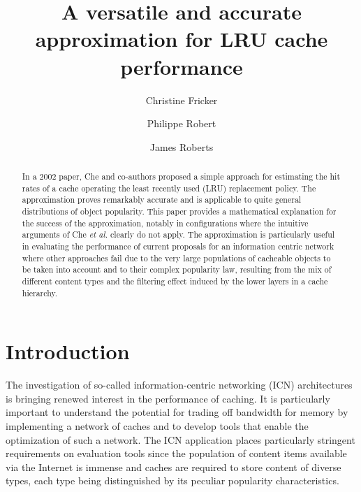 \documentclass{amsart}
\author[C. Fricker]{Christine Fricker}
\author[Ph. Robert]{Philippe Robert}
\author[J. Roberts]{James Roberts}
\def\etal{{\em et al. }}
\begin{document}
\title{A versatile and accurate approximation for LRU cache performance }











\begin{abstract}
In a 2002 paper, Che and co-authors proposed a simple approach for estimating the hit rates of a cache operating the least recently used (LRU) replacement policy. The approximation proves remarkably accurate and is applicable to quite general distributions of object popularity. This paper provides a mathematical explanation for the success of the approximation, notably in configurations where the intuitive arguments of Che \etal clearly do not apply. The approximation is particularly useful in evaluating the performance of current proposals for an information centric network where other approaches fail due to the very large populations of cacheable objects to be taken into account and to their complex popularity law, resulting from the mix of different content types and the filtering effect induced by the lower layers in a cache hierarchy. 
\end{abstract}




\maketitle











\section{Introduction}

The investigation of so-called information-centric networking (ICN) architectures is bringing renewed interest in the performance of caching. It is particularly important to understand the potential for trading off bandwidth for memory by implementing a network of caches and to develop tools that enable the optimization of such a network. The ICN application places particularly stringent requirements on evaluation tools since the population of content items available via the Internet is immense and caches are required to store content of diverse types, each type being distinguished by its peculiar popularity characteristics. 
\end{document}

